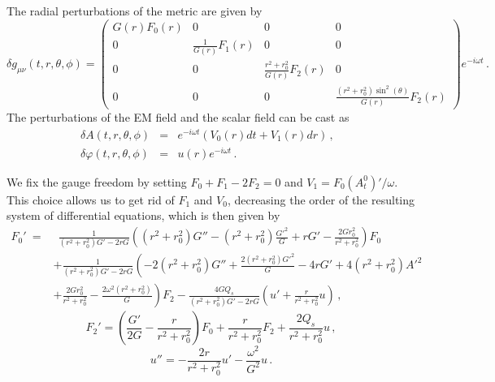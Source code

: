 \documentclass[11pt,a4paper]{article}
\begin{document}
The radial perturbations of the metric are given by
%
\begin{equation}
    \delta g_{\mu\nu}(t,r,\theta,\phi)=\begin{pmatrix}
G(r)F_0(r) & 0 & 0 & 0\\
0 & \frac{1}{G(r)}F_1(r) & 0 & 0\\
0 & 0 & \frac{r^2+r_0^2}{G(r)}F_2(r) & 0\\
0 & 0 & 0 & \frac{(r^2+r_0^2)\sin^2(\theta)}{G(r)}F_2(r)
\end{pmatrix}e^{-i\omega t} \,.
\end{equation}
%
The perturbations of the EM field and the scalar field can be cast as
\begin{eqnarray}\label{deltaA_radial}
\delta A(t,r,\theta,\phi)&=& e^{-i\omega t} \left( V_0(r)dt  
+ V_1(r)dr   
\right) \, ,
\ \ \ \\
\delta\varphi(t,r,\theta,\phi)&=&u(r)e^{-i\omega t} \, .
\end{eqnarray}
%

We fix the gauge freedom by setting $F_0+F_1-2F_2=0$ and $V_1=F_0(A_t^{0})'/\omega$. 
This choice allows us to get rid of $F_1$ and $V_0$, decreasing the order of the resulting system of differential equations, which is then given by
%
\begin{equation}\label{eq_F0_radial}
\begin{split}
    F_0'\:= & \:\:\frac{1}{(r^2+r_0^2)G'-2rG}\left((r^2+r_0^2)G''-(r^2+r_0^2)\frac{G'^2}{G}+rG'-\frac{2Gr_0^2}{r^2+r_0^2}\right)F_0\\
    & +\frac{1}{(r^2+r_0^2)G'-2rG}\left(-2(r^2+r_0^2)G''+\frac{2(r^2+r_0^2)G'^2}{G}-4rG'+4(r^2+r_0^2)A'^2\right.\\
    & \left.+\frac{2Gr_0^2}{r^2+r_0^2}-\frac{2\omega^2(r^2+r_0^2)}{G}\right)F_2-\frac{4GQ_s}{(r^2+r_0^2)G'-2rG}\left(u'+\frac{r}{r^2+r_0^2}u\right) \,,
\end{split}
\end{equation}
%
\begin{equation}\label{eq_F2_radial}
    F_2'=\left(\frac{G'}{2G}-\frac{r}{r^2+r_0^2}\right)F_0+\frac{r}{r^2+r_0^2}F_2+\frac{2Q_s}{r^2+r_0^2}u \,,
\end{equation}
%
\begin{equation}\label{eq_u_radial}
    u''=-\frac{2r}{r^2+r_0^2}u'-\frac{\omega^2}{G^2}u \,.
\end{equation}
\end{document}
